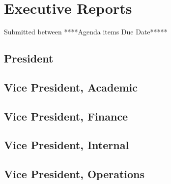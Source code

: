 
\section*{Executive Reports}
Submitted between ****Agenda items Due Date*****

\subsection*{President}
\label{sec:president}


\subsection*{Vice President, Academic}
\label{sec:vpacademic}


\subsection*{Vice President, Finance}
\label{sec:vpfinance}


\subsection*{Vice President, Internal}
\label{sec:vpinternal}


\subsection*{Vice President, Operations}
\label{sec:vpoperations}

